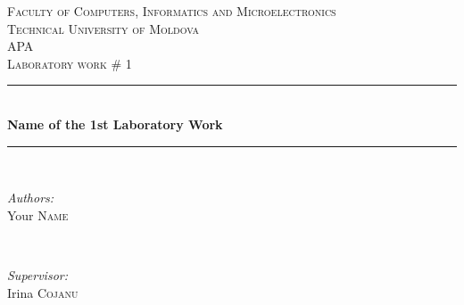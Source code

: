 \documentclass[12pt]{article}
\begin{document}
  \begin{titlepage}

 \newcommand{\HRule}{\rule{\linewidth}{0.5mm}} %
  \begin{center} %

  \textsc{\large Faculty of Computers, Informatics and Microelectronics}\\[0.5cm]
  \textsc{\large Technical University of Moldova}\\[1.2cm] %
  \vspace{35 mm}
  \textsc{\Large APA}\\[0.5cm] %
  \textsc{\large Laboratory work \# 1}\\[0.5cm] %

  \vspace{10 mm}
  \HRule \\[0.4cm]
  { \LARGE \bfseries Name of the 1st Laboratory Work }\\[0.4cm] %
  \HRule \\[1.5cm]

      \vspace{30mm}

      \begin{minipage}{0.4\textwidth}
      \begin{flushleft} \large
      \emph{Authors:}\\
      Your \textsc{Name}
      \end{flushleft}
      \end{minipage}
      ~
      \begin{minipage}{0.4\textwidth}
      \begin{flushright} \large
      \emph{Supervisor:} \\
      Irina \textsc{Cojanu} %
      \end{flushright}
      \end{minipage}\\[4cm]


\end{center}
\end{titlepage}
\end{document}
